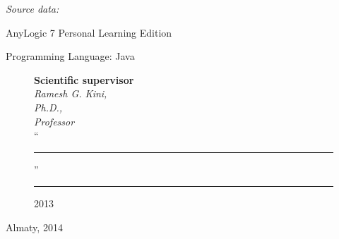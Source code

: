 \begin{titlepage}
    \emph{Source data:}

    \begin{compactitem}
    \item AnyLogic 7 Personal Learning Edition
    \item Programming Language: Java
    \end{compactitem}


    \begin{figure}[ht]
            \begin{minipage}[t]{0.6\linewidth}
                {\bf Scientific supervisor}\\

                {\em Ramesh G. Kini,\\
                Ph.D.,\\
                Professor}\\

                ``\rule{2em}{0.4pt}'' \rule{8em}{0.4pt} 2013\\
         \end{minipage}
    \end{figure}

    \begin{center}
        \vfill
        Almaty, 2014
    \end{center}

    \end{titlepage}